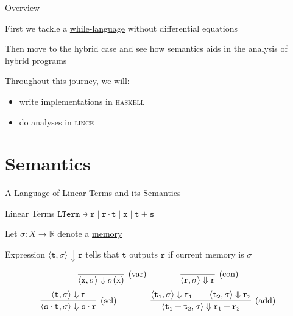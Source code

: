 \documentclass{beamer}
\begin{document}
\begin{frame}{Overview}

        First we tackle a \alert{\underline{while-language}} without
        differential equations

        Then move to the hybrid case and see how semantics aids in the analysis
        of hybrid programs

        Throughout this journey, we will:
        \begin{itemize}
                \item write implementations in \textsc{haskell}
                \item do analyses in \textsc{lince}
        \end{itemize}
\end{frame}

\section{Semantics}

\begin{frame}{A Language of Linear Terms and its Semantics}

        \begin{block}{Linear Terms}
	$\mathtt{LTerm} \ni \mathtt{r} \mid \mathtt{r \cdot t}
        \mid \mathtt{x}  \mid \mathtt{t + s }$
	\end{block}

        Let $\sigma : X \to \mathbb{R}$ denote a \alert{\underline{memory}}

        Expression $\langle \mathtt{t},\sigma \rangle \Downarrow \mathtt{r}$
        tells that $\mathtt{t}$ outputs $\mathtt{r}$ if current memory is
        $\sigma$

        \[
                \infer[(\text{var})]{\langle \mathtt{x}, \sigma \rangle 
                \Downarrow \sigma(\mathtt{x})}{} \qquad \qquad
                \infer[(\text{con})]{\langle \mathtt{r}, \sigma \rangle 
                \Downarrow \mathtt{r}}{}
        \] \vspace{0.1cm}        
        \[        
                \infer[(\text{scl})]{  
                        \langle \mathtt{s} \cdot \mathtt{t}, \sigma \rangle \Downarrow 
                        \mathtt{s \cdot r}
                        }{
                        \langle \mathtt{t}, \sigma \rangle \Downarrow \mathtt{r}
                } \qquad \qquad
                \infer[(\text{add})]{  
                        \langle \mathtt{t_1} + \mathtt{t_2}, \sigma \rangle \Downarrow 
                        \mathtt{r_1 + r_2}
                        }{
                        \langle \mathtt{t_1}, \sigma \rangle \Downarrow \mathtt{r_1} \qquad
                        \langle \mathtt{t_2}, \sigma \rangle \Downarrow \mathtt{r_2}
                }
        \]
\end{frame}        
\end{document}
